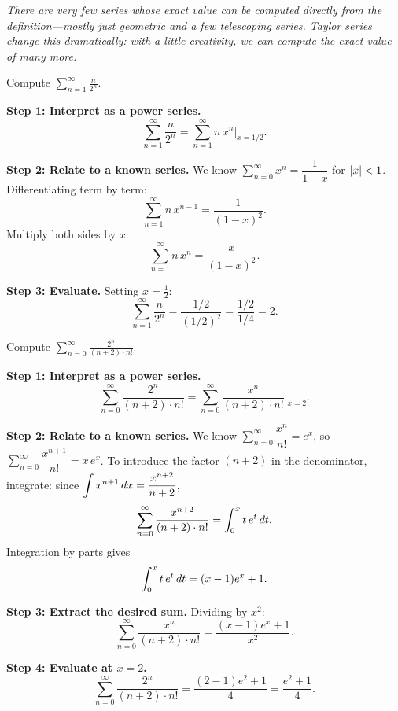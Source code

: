 \textit{There are very few series whose exact value can be computed directly from the definition---mostly just geometric and a few telescoping series.  Taylor series change this dramatically: with a little creativity, we can compute the exact value of many more.}

\begin{example}[Sum of $n/2^{n}$]
\label{ex:14-15}
Compute $\displaystyle\sum_{n=1}^{\infty}\frac{n}{2^{n}}$.

\textbf{Step 1: Interpret as a power series.}
\[
  \sum_{n=1}^{\infty}\frac{n}{2^{n}}
  = \sum_{n=1}^{\infty}n\,x^{n}\bigg|_{x=1/2}.
\]

\textbf{Step 2: Relate to a known series.}  We know $\sum_{n=0}^{\infty}x^{n}=\dfrac{1}{1-x}$ for $\left\lvert x \right\rvert<1$.  Differentiating term by term:
\[
  \sum_{n=1}^{\infty}n\,x^{n-1} = \frac{1}{(1-x)^{2}}.
\]
Multiply both sides by $x$:
\[
  \sum_{n=1}^{\infty}n\,x^{n} = \frac{x}{(1-x)^{2}}.
\]

\textbf{Step 3: Evaluate.}  Setting $x=\frac{1}{2}$:
\[
  \sum_{n=1}^{\infty}\frac{n}{2^{n}}
  = \frac{1/2}{(1/2)^{2}}
  = \frac{1/2}{1/4}
  = 2.
\]
\end{example}

\begin{example}
\label{ex:14-16}
Compute $\displaystyle\sum_{n=0}^{\infty}\frac{2^{n}}{(n+2)\cdot n!}$.

\textbf{Step 1: Interpret as a power series.}
\[
  \sum_{n=0}^{\infty}\frac{2^{n}}{(n+2)\cdot n!}
  = \sum_{n=0}^{\infty}\frac{x^{n}}{(n+2)\cdot n!}\bigg|_{x=2}.
\]

\textbf{Step 2: Relate to a known series.}  We know $\sum_{n=0}^{\infty}\dfrac{x^{n}}{n!}=e^{x}$, so $\sum_{n=0}^{\infty}\dfrac{x^{n+1}}{n!}=x\,e^{x}$.  To introduce the factor $(n+2)$ in the denominator, integrate: since $\displaystyle\int x^{n+1}\,dx = \frac{x^{n+2}}{n+2}$,
\[
  \sum_{n=0}^{\infty}\frac{x^{n+2}}{(n+2)\cdot n!}
  = \int_{0}^{x}t\,e^{t}\,dt.
\]
Integration by parts gives
\[
  \int_{0}^{x}t\,e^{t}\,dt = (x-1)e^{x}+1.
\]

\textbf{Step 3: Extract the desired sum.}  Dividing by $x^{2}$:
\[
  \sum_{n=0}^{\infty}\frac{x^{n}}{(n+2)\cdot n!}
  = \frac{(x-1)e^{x}+1}{x^{2}}.
\]

\textbf{Step 4: Evaluate at $x=2$.}
\[
  \sum_{n=0}^{\infty}\frac{2^{n}}{(n+2)\cdot n!}
  = \frac{(2-1)e^{2}+1}{4}
  = \frac{e^{2}+1}{4}.
\]
\end{example}

